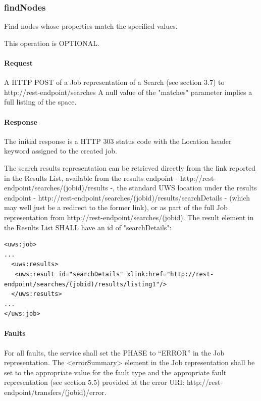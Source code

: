 \documentclass[11pt,a4paper]{ivoa}
\begin{document}
\subsubsection{findNodes}
\label{subsubsec:findnodes}
Find nodes whose properties match the specified values.

This operation is OPTIONAL.

\paragraph{Request}
A HTTP POST of a Job representation of a Search (see section 3.7) to http://rest-endpoint/searches
A null value of the "matches" parameter implies a full listing of the space.

\paragraph{Response}
The initial response is a HTTP 303 status code with the Location header keyword assigned to the created job.

The search results representation can be retrieved directly from the link reported in the Results List, available from the results endpoint - http://rest-endpoint/searches/(jobid)/results -, the standard UWS location under the results endpoint - http://rest-endpoint/searches/(jobid)/results/searchDetails - (which may well just be a redirect to the former link), or as part of the full Job representation from http://rest-endpoint/searches/(jobid). The result element in the Results List SHALL have an id of "searchDetails":

\begin{lstlisting}
<uws:job>
...
  <uws:results>
   <uws:result id="searchDetails" xlink:href="http://rest-endpoint/searches/(jobid)/results/listing1"/>
  </uws:results>
...
</uws:job>
\end{lstlisting}

\paragraph{Faults}
For all faults, the service shall set the PHASE to ``ERROR'' in the Job representation. The <errorSummary> element in the Job representation shall be set to the appropriate value for the fault type and the appropriate fault representation (see section 5.5) provided at the error URI: http://rest-endpoint/transfers/(jobid)/error.
\end{document}
